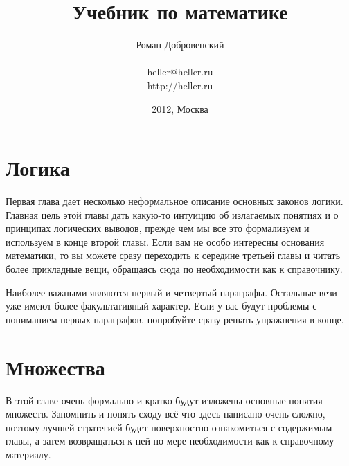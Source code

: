 \documentclass[a5paper,10pt,pagesize,DIV=classic]{scrbook}
\begin{document}
\title{Учебник по математике}
\author{Роман Добровенский\\ \\heller@heller.ru\\http://heller.ru}
\date{2012, Москва}
\maketitle

\tableofcontents



\chapter{Логика}
Первая глава дает несколько неформальное описание основных законов логики. Главная цель этой главы дать какую-то интуицию об излагаемых понятиях и о принципах логических выводов, прежде чем мы все это формализуем и используем в конце второй главы. Если вам не особо интересны основания математики, то вы можете сразу переходить к середине третьей главы и читать более прикладные вещи, обращаясь сюда по необходимости как к справочнику.

Наиболее важными являются первый и четвертый параграфы. Остальные вези уже имеют более факультативный характер. Если у вас будут проблемы с пониманием первых параграфов, попробуйте сразу решать упражнения в конце.











\chapter{Множества}
В этой главе очень формально и кратко будут изложены основные понятия множеств. Запомнить и понять сходу всё что здесь написано очень сложно, поэтому лучшей стратегией будет поверхностно ознакомиться с содержимым главы, а затем возвращаться к ней по мере необходимости как к справочному материалу.



\end{document}
